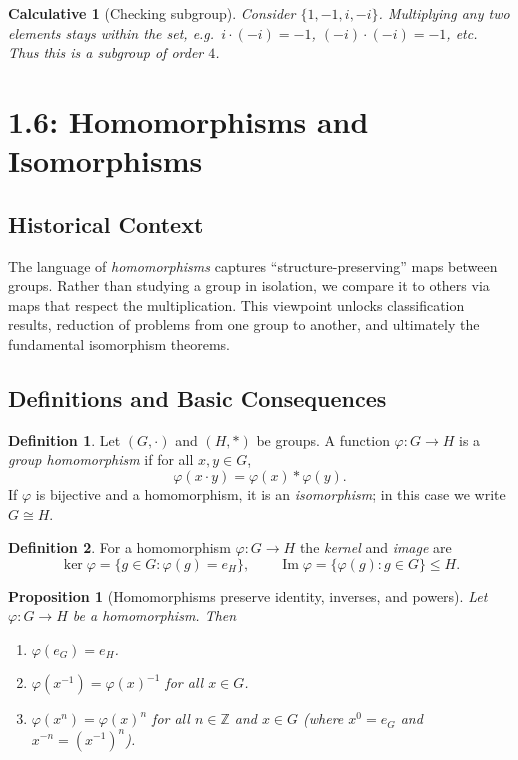 \documentclass[12pt]{article}
\newtheorem{proposition}[theorem]{Proposition}
\newtheorem{calculative}[theorem]{Calculative}
\theoremstyle{definition}
\newtheorem{definition}{Definition}
\begin{document}
\begin{calculative}[Checking subgroup]
Consider $\{1,-1,i,-i\}$. Multiplying any two elements stays within the set,
e.g.\ $i\cdot (-i)=-1$, $(-i)\cdot (-i)=-1$, etc. Thus this is a subgroup of order $4$.
\end{calculative}

\newpage

\dotfill
\section*{1.6: Homomorphisms and Isomorphisms}
\dotfill

\subsection*{Historical Context}
The language of \emph{homomorphisms} captures ``structure-preserving'' maps between groups.
Rather than studying a group in isolation, we compare it to others via maps that respect the
multiplication. This viewpoint unlocks classification results, reduction of problems from one
group to another, and ultimately the fundamental isomorphism theorems.

\subsection*{Definitions and Basic Consequences}

\begin{definition}
Let $(G,\cdot)$ and $(H,\ast)$ be groups. A function $\varphi:G\to H$ is a \emph{group homomorphism}
if for all $x,y\in G$,
\[
\varphi(x\cdot y)=\varphi(x)\ast\varphi(y).
\]
If $\varphi$ is bijective and a homomorphism, it is an \emph{isomorphism}; in this case we write $G\cong H$.
\end{definition}

\begin{definition}
For a homomorphism $\varphi:G\to H$ the \emph{kernel} and \emph{image} are
\[
\ker\varphi=\{g\in G:\varphi(g)=e_H\},\qquad \operatorname{Im}\varphi=\{\varphi(g):g\in G\}\le H.
\]
\end{definition}

\begin{proposition}[Homomorphisms preserve identity, inverses, and powers]
Let $\varphi:G\to H$ be a homomorphism. Then
\begin{enumerate}
    \item $\varphi(e_G)=e_H$.
    \item $\varphi(x^{-1})=\varphi(x)^{-1}$ for all $x\in G$.
    \item $\varphi(x^n)=\varphi(x)^n$ for all $n\in\mathbb{Z}$ and $x\in G$ (where $x^0=e_G$ and $x^{-n}=(x^{-1})^n$).
\end{enumerate}
\end{proposition}
\end{document}
